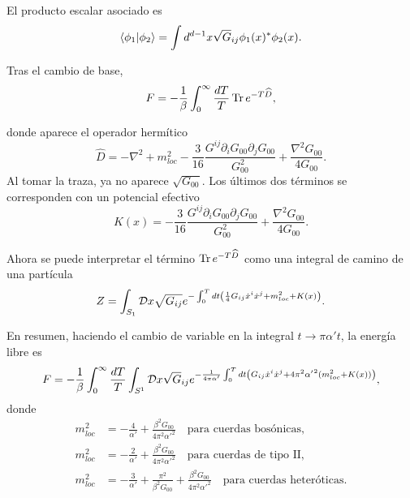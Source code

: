 El producto escalar asociado es
\begin{equation}
  \braket{\phi_1}{\phi_2} = \int d^{d-1} x \sqrt G_{ij} \phi_1(x)^* \phi_2(x).
\end{equation}

Tras el cambio de base,
\begin{equation}
  F=-\frac{1}{\beta}\int_0^\infty \frac{dT}{T} \Tr e^{-T\widehat D},
\end{equation}

donde aparece el operador hermítico
\begin{equation}
  \widehat D = -\nabla^2  + m_{loc}^2- \frac{3}{16}\frac{G^{ij} \partial_i G_{00}\partial_j G_{00}}{G_{00}^2}
  +\frac{\nabla^2 G_{00}}{4G_{00}}.
\end{equation}
Al tomar la traza, ya no aparece $\sqrt{G_{00}}$.
Los últimos dos términos se corresponden con un potencial efectivo
\begin{equation}
  K(x) = -\frac{3}{16}\frac{G^{ij} \partial_i G_{00}\partial_j G_{00}}{G_{00}^2}
  +\frac{\nabla^2 G_{00}}{4G_{00}}.
\end{equation}

Ahora se puede interpretar el término $\Tr e^{-T\widehat{D}}$ como una integral de camino
de una partícula 
\begin{equation}
Z=  \int_{S_1} \mathcal D x \sqrt{G_{ij}} e^{-\int_0^T dt \qty(\frac{1}{4}G_{ij}\dot x^i\dot x^j+m_{loc}^2+K(x))}.
\end{equation}

En resumen, haciendo el cambio de variable en la integral $t\to\pi \alpha't$, la energía libre es
\begin{equation}
  F=-\frac{1}{\beta}\int_0^\infty \frac{dT}{T} \int_{S^1} \mathcal D x\sqrt G_{ij}  e^{ -\frac{1}{4\pi\alpha'}\int_0^T dt \qty(  
  G_{ij}\dot x^i \dot x^j  + 4\pi^2{\alpha'}^2 (m_{loc}^2+K(x)))},
\end{equation}
donde
\begin{equation}
  \begin{aligned}
    m_{loc}^2 &= -\frac{4}{\alpha'}+\frac{\beta^2G_{00}}{4\pi^2 \alpha'^2} \quad\text{para cuerdas bosónicas},\\
    m_{loc}^2 &= -\frac{2}{\alpha'}+\frac{\beta^2G_{00}}{4\pi^2 \alpha'^2} \quad\text{para cuerdas de tipo II},\\
    m_{loc}^2 &= -\frac{3}{\alpha'}+\frac{\pi^2}{\beta^2 G_{00}}+\frac{\beta^2G_{00}}{4\pi^2 \alpha'^2}\quad\text{para cuerdas heteróticas}.
  \end{aligned}
\end{equation}

